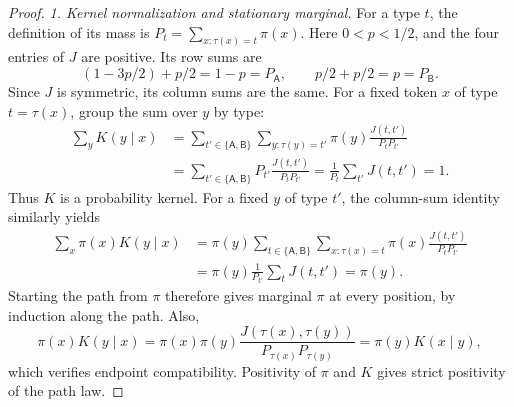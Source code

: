 \begin{proof}
\emph{1. Kernel normalization and stationary marginal.}
For a type $t$, the definition of its mass is
$P_t=\sum_{x:\tau(x)=t}\pi(x)$.
Here $0<p<1/2$, and the four entries of $J$ are positive.  Its row sums are
\[
 (1-3p/2)+p/2=1-p=P_{\mathsf A},\qquad
 p/2+p/2=p=P_{\mathsf B}.
\]
Since $J$ is symmetric, its column sums are the same.
For a fixed token $x$ of type $t=\tau(x)$, group the sum over $y$ by type:
\begin{align*}
 \sum_yK(y\mid x)
 &=\sum_{t'\in\{\mathsf A,\mathsf B\}}
       \sum_{y:\tau(y)=t'}\pi(y)\frac{J(t,t')}{P_tP_{t'}}\\
 &=\sum_{t'\in\{\mathsf A,\mathsf B\}}
       P_{t'}\frac{J(t,t')}{P_tP_{t'}}
 =\frac1{P_t}\sum_{t'}J(t,t')=1.
\end{align*}
Thus $K$ is a probability kernel.  For a fixed $y$ of type $t'$,
the column-sum identity similarly yields
\begin{align*}
 \sum_x\pi(x)K(y\mid x)
 &=\pi(y)\sum_{t\in\{\mathsf A,\mathsf B\}}
       \sum_{x:\tau(x)=t}\pi(x)\frac{J(t,t')}{P_tP_{t'}}\\
 &=\pi(y)\frac1{P_{t'}}\sum_tJ(t,t')=\pi(y).
\end{align*}
Starting the path from $\pi$ therefore gives marginal $\pi$ at every
position, by induction along the path.  Also,
\[
 \pi(x)K(y\mid x)
 =\pi(x)\pi(y)\frac{J(\tau(x),\tau(y))}
                      {P_{\tau(x)}P_{\tau(y)}}
 =\pi(y)K(x\mid y),
\]
which verifies endpoint compatibility.  Positivity of $\pi$ and $K$
gives strict positivity of the path law.


\end{proof}
